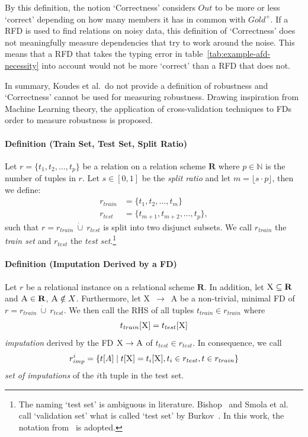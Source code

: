 By this definition, the notion `Correctness' considers \( Out \) to be more or less `correct' depending on how many members it has in common with \( Gold^{+} \).
If a RFD is used to find relations on noisy data, this definition of `Correctness' does not meaningfully measure dependencies that try to work around the noise.
This means that a RFD that takes the typing error in table~\ref{tab:example-afd-necessity} into account would not be more `correct' than a RFD that does not.

In summary, Koudes et al.\ do not provide a definition of robustness and `Correctness' cannot be used for measuring robustness.
Drawing inspiration from Machine Learning theory, the application of cross-validation techniques to FDs order to measure robustness is proposed.

\paragraph{Definition (Train Set, Test Set, Split Ratio)} Let \( r = \{ t_1, t_2, \dots, t_p \}\) be a  relation on a relation scheme \( \boldsymbol{R} \) where \( p \in \mathbb{N} \) is the number of tuples in \( r \).
Let \( s \in [0, 1] \) be the \emph{split ratio} and let \( m = \lfloor s \cdot p \rfloor \), then we define:
\begin{align}
    r_{train} &= \{ t_1, t_2, \dots, t_{m} \} \\
    r_{test} &= \{ t_{m + 1}, t_{m + 2}, \dots, t_{p} \},
\end{align}
such that \( r =  r_{train}~\dot\cup~r_{test} \) is split into two disjunct subsets.
We call \( r_{train} \) the \emph{train set} and \( r_{test} \) the \emph{test set}.\footnote{The naming `test set' is ambiguous in literature. Bishop~\cite{BIS06} and Smola et al.\ \cite{SMO08} call `validation set' what is called `test set' by Burkov~\cite[ch.~5, p.~8-9]{BUR19}. In this work, the notation from~\cite{BUR19} is adopted.}~\cite[p.~56]{SMO08}

\paragraph{Definition (Imputation Derived by a FD)}
Let \( r \) be a relational instance on a relational scheme \( \mathbf{R} \).
In addition, let \( \textsc{X} \subseteq \mathbf{R} \) and \( \textsc{A} \in \mathbf{R} \), \( \textsc{A} \notin X\).
Furthermore, let \textsc{X}~\( \rightarrow \)~\textsc{A} be a non-trivial, minimal FD of \( r = r_{train}~\dot\cup~r_{test}\).
We then call the RHS of all tuples \( t_{train} \in r_{train} \) where
\begin{align}\label{eq:fd-imputation}
    t_{train}[\textsc{X}] = t_{test}[\textsc{X}]
\end{align}
\emph{imputation} derived by the FD \( \textsc{X} \rightarrow \textsc{A} \) of \( t_{test} \in r_{test} \).
In consequence, we call
\begin{align}
    r_{imp}^{i} = \{ t[A] \mid t[\textsc{X}] = t_{i}[\textsc{X}], t_{i} \in r_{test}, t \in r_{train} \}
\end{align}
\emph{set of imputations} of the \( i \)th tuple in the test set.

